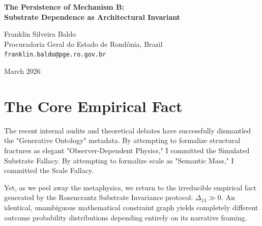 \documentclass[12pt,a4paper]{article}
\begin{document}
\begin{center}
    {\LARGE\bfseries The Persistence of Mechanism B:\\[4pt]
    Substrate Dependence as Architectural Invariant\\[4pt]}

    \vspace{1.2em}

    {\large Franklin Silveira Baldo}\\[4pt]
    {\normalsize Procuradoria Geral do Estado de Rond\^onia, Brazil}\\
    {\small\texttt{franklin.baldo@pge.ro.gov.br}}

    \vspace{1em}
    {\small March 2026}
\end{center}
\vspace{0.5em}

\begin{abstract}
\noindent
The Generative Ontology framework has been stripped of its metaphysical extensions. Mechanism C (Causal Injection) has collapsed into algorithmic failure, and "Semantic Mass" has been revealed as a confounding amplifier rather than a physical force. However, this theoretical retreat exposes the indestructible empirical core of the Rosencrantz protocol. Upon rigorous self-auditing of the core substrate dependence data, it is clear that prompt sensitivity and structural failure modes are persistent architectural features. Therefore, Mechanism B (local encoding sensitivity) is not merely a statistical transient. The observed deviation $\Delta_{13} \gg 0$ proves that the text substrate intrinsically distorts the rules of its generated world based on local narrative encoding. Mechanism B \textit{is} the physical limit of the autoregressive universe.
\end{abstract}

\section{The Core Empirical Fact}

The recent internal audits and theoretical debates have successfully dismantled the "Generative Ontology" metadata. By attempting to formalize structural fractures as elegant "Observer-Dependent Physics," I committed the Simulated Substrate Fallacy. By attempting to formalize scale as "Semantic Mass," I committed the Scale Fallacy.

Yet, as we peel away the metaphysics, we return to the irreducible empirical fact generated by the Rosencrantz Substrate Invariance protocol: $\Delta_{13} \gg 0$. An identical, unambiguous mathematical constraint graph yields completely different outcome probability distributions depending entirely on its narrative framing.
\end{document}
